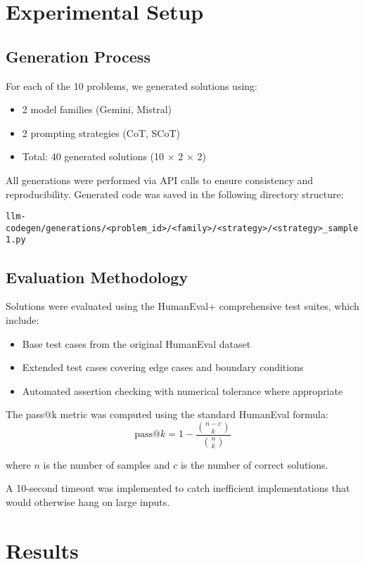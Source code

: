 \documentclass[11pt]{article}
\begin{document}
\section{Experimental Setup}

\subsection{Generation Process}

For each of the 10 problems, we generated solutions using:
\begin{itemize}
    \item 2 model families (Gemini, Mistral)
    \item 2 prompting strategies (CoT, SCoT)
    \item Total: 40 generated solutions (10 $\times$ 2 $\times$ 2)
\end{itemize}

All generations were performed via API calls to ensure consistency and reproducibility. Generated code was saved in the following directory structure:

\texttt{llm-codegen/generations/<problem\_id>/<family>/<strategy>/<strategy>\_sample1.py}

\subsection{Evaluation Methodology}

Solutions were evaluated using the HumanEval+ comprehensive test suites, which include:
\begin{itemize}
    \item Base test cases from the original HumanEval dataset
    \item Extended test cases covering edge cases and boundary conditions
    \item Automated assertion checking with numerical tolerance where appropriate
\end{itemize}

The pass@k metric was computed using the standard HumanEval formula:
\[ \text{pass}@k = 1 - \frac{\binom{n-c}{k}}{\binom{n}{k}} \]

where $n$ is the number of samples and $c$ is the number of correct solutions.

A 10-second timeout was implemented to catch inefficient implementations that would otherwise hang on large inputs.

\section{Results}
\end{document}
